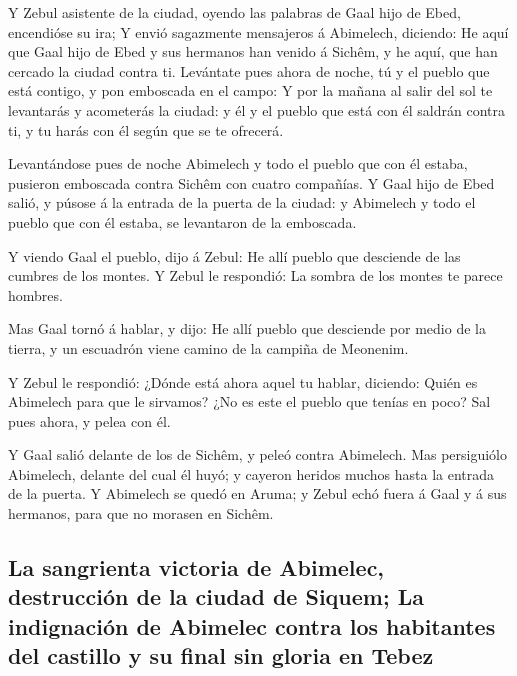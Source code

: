  Y Zebul asistente de la ciudad, oyendo las palabras de
Gaal hijo de Ebed, encendióse su ira;  Y envió sagazmente
mensajeros á Abimelech, diciendo: He aquí que Gaal hijo de Ebed y sus
hermanos han venido á Sichêm, y he aquí, que han cercado la ciudad
contra ti.  Levántate pues ahora de noche, tú y el pueblo
que está contigo, y pon emboscada en el campo:  Y por la
mañana al salir del sol te levantarás y acometerás la ciudad: y él y el
pueblo que está con él saldrán contra ti, y tu harás con él según que se
te ofrecerá.

 Levantándose pues de noche Abimelech y todo el pueblo que
con él estaba, pusieron emboscada contra Sichêm con cuatro compañías.
 Y Gaal hijo de Ebed salió, y púsose á la entrada de la
puerta de la ciudad: y Abimelech y todo el pueblo que con él estaba, se
levantaron de la emboscada.

 Y viendo Gaal el pueblo, dijo á Zebul: He allí pueblo que
desciende de las cumbres de los montes. Y Zebul le respondió: La sombra
de los montes te parece hombres.

 Mas Gaal tornó á hablar, y dijo: He allí pueblo que
desciende por medio de la tierra, y un escuadrón viene camino de la
campiña de Meonenim.

 Y Zebul le respondió: ¿Dónde está ahora aquel tu hablar,
diciendo: Quién es Abimelech para que le sirvamos? ¿No es este el pueblo
que tenías en poco? Sal pues ahora, y pelea con él.

 Y Gaal salió delante de los de Sichêm, y peleó contra
Abimelech.  Mas persiguiólo Abimelech, delante del cual él
huyó; y cayeron heridos muchos hasta la entrada de la puerta.
 Y Abimelech se quedó en Aruma; y Zebul echó fuera á Gaal y
á sus hermanos, para que no morasen en Sichêm.

\hypertarget{la-sangrienta-victoria-de-abimelec-destrucciuxf3n-de-la-ciudad-de-siquem-la-indignaciuxf3n-de-abimelec-contra-los-habitantes-del-castillo-y-su-final-sin-gloria-en-tebez}{%
\subsection{La sangrienta victoria de Abimelec, destrucción de la ciudad
de Siquem; La indignación de Abimelec contra los habitantes del castillo
y su final sin gloria en
Tebez}\label{la-sangrienta-victoria-de-abimelec-destrucciuxf3n-de-la-ciudad-de-siquem-la-indignaciuxf3n-de-abimelec-contra-los-habitantes-del-castillo-y-su-final-sin-gloria-en-tebez}}

